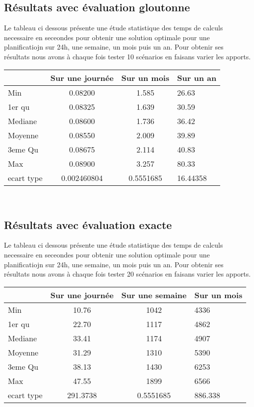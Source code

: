 \documentclass[a4paper]{report}
\begin{document}
\subsection{Résultats avec évaluation gloutonne}
Le tableau ci dessous présente une étude statistique des temps de calculs necessaire en seceondes pour obtenir une solution optimale pour une planificatiojn sur 24h, une semaine, un mois puis un an. Pour obtenir ses résultats nous avons à chaque fois tester 10 scénarios en faisans varier les apports.\\
\begin{tabular}{|l|c|c|l|}
  \hline
  &Sur une journée&Sur un mois&Sur un an\\
  \hline
  Min &0.08200 &1.585&26.63\\
  \hline
  1er qu & 0.08325 & 1.639 &30.59
\\
  \hline
  Mediane & 0.08600&1.736 &36.42
\\
  \hline
  Moyenne &0.08550 & 2.009 &39.89
\\
  \hline
  3eme Qu &0.08675&2.114&40.83\\
  \hline
  Max & 0.08900 &3.257&80.33\\
\hline
 ecart type & 0.002460804 & 0.5551685 &16.44358\\
 
  \hline
\end{tabular}
\\
\subsection{Résultats avec évaluation exacte}
Le tableau ci dessous présente une étude statistique des temps de calculs necessaire en seceondes pour obtenir une solution optimale pour une planificatiojn sur 24h, une semaine, un mois puis un an. Pour obtenir ses résultats nous avons à chaque fois tester 20 scénarios en faisans varier les apports.\\
\begin{tabular}{|l|c|c|l|}
  \hline
  &Sur une journée&Sur une semaine &Sur un mois\\
  \hline
  Min &10.76 &1042&4336\\
  \hline
  1er qu & 22.70 & 1117   &4862
\\
  \hline
  Mediane & 33.41&1174 &4907
\\
  \hline
  Moyenne &31.29 & 1310 &5390  

\\
  \hline
  3eme Qu &38.13&1430&6253\\
  \hline
  Max & 47.55 &1899&6566\\
\hline
 ecart type &291.3738 & 0.5551685 &886.338\\
 
  \hline
\end{tabular}
\\
\end{document}
